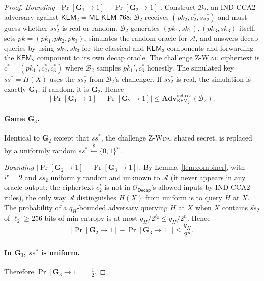 \documentclass[11pt,a4paper]{article}
\theoremstyle{definition}
\theoremstyle{remark}
\newcommand{\KEM}{\ensuremath{\mathsf{KEM}}}
\newcommand{\Decap}{\ensuremath{\mathsf{Decap}}}
\newcommand{\Adv}{\ensuremath{\mathbf{Adv}}}
\providecommand{\Game}{}\renewcommand{\Game}{\ensuremath{\mathbf{G}}}
\newcommand{\zwing}{\textsc{Z-Wing}}
\newcommand{\mlkem}{\ensuremath{\mathsf{ML\text{-}KEM}}}
\newcommand{\BB}{\ensuremath{\{0,1\}}}
\begin{document}
\begin{proof}
\emph{Bounding $|\Pr[\Game_1 \to 1] - \Pr[\Game_2 \to 1]|$.}
Construct $\mathcal{B}_2$, an IND-CCA2 adversary against $\KEM_2 = \mlkem$-768:
$\mathcal{B}_2$ receives $(pk_2, c_2^*, ss_2^*)$ and must guess whether
$ss_2^*$ is real or random. $\mathcal{B}_2$ generates $(pk_1, sk_1), (pk_3, sk_3)$
itself, sets $pk = (pk_1, pk_2, pk_3)$, simulates the random oracle for
$\mathcal{A}$, and answers decap queries by using $sk_1, sk_3$ for the
classical and $\KEM_3$ components and forwarding the $\KEM_2$ component to
its own decap oracle. The challenge \zwing{} ciphertext is
$c^* = (pk_1', c_2^*, c_3^*)$ where $\mathcal{B}_2$ samples $pk_1', c_3^*$
honestly. The simulated key $ss^* = H(X)$ uses the $ss_2^*$ from
$\mathcal{B}_2$'s challenger.
If $ss_2^*$ is real, the simulation is exactly $\Game_1$; if random, it is
$\Game_2$. Hence
\[
|\Pr[\Game_1 \to 1] - \Pr[\Game_2 \to 1]| \le \Adv^{\mathsf{ind\text{-}cca}}_{\KEM_2}(\mathcal{B}_2).
\]

\paragraph{Game $\Game_3$.} Identical to $\Game_2$ except that $ss^*$, the
challenge \zwing{} shared secret, is replaced by a uniformly random
$\widetilde{ss^*} \xleftarrow{\$} \BB^n$.

\emph{Bounding $|\Pr[\Game_2 \to 1] - \Pr[\Game_3 \to 1]|$.}
By Lemma~\ref{lem:combiner}, with $i^\star = 2$ and $\widetilde{ss_2}$
uniformly random and unknown to $\mathcal{A}$ (it never appears in any
oracle output: the ciphertext $c_2^*$ is not in $\mathcal{O}_\Decap$'s
allowed inputs by IND-CCA2 rules), the only way $\mathcal{A}$
distinguishes $H(X)$ from uniform is to query $H$ at $X$. The probability of
a $q_H$-bounded adversary querying $H$ at $X$ when $X$ contains
$\widetilde{ss_2}$ of $\ell_2 \ge 256$ bits of min-entropy is at most
$q_H / 2^{\ell_2} \le q_H / 2^n$. Hence
\[
|\Pr[\Game_2 \to 1] - \Pr[\Game_3 \to 1]| \le \frac{q_H}{2^n}.
\]

\paragraph{In $\Game_3$, $ss^*$ is uniform.}
Therefore $\Pr[\Game_3 \to 1] = \frac{1}{2}$.


\end{proof}
\end{document}
